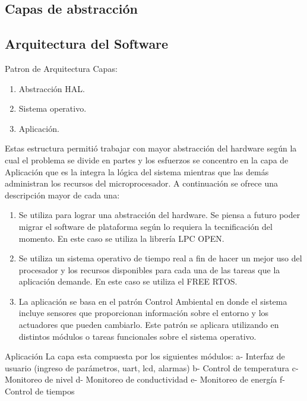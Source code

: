\subsection{Capas de abstracción}
\subsection{Arquitectura del Software}

Patron de Arquitectura
Capas: 
\begin{enumerate}
	\item Abstracción HAL.
	\item Sistema operativo.
	\item Aplicación.
\end{enumerate}

Estas estructura permitió trabajar con mayor abstracción del hardware según la cual el problema se divide en partes y los esfuerzos se concentro en la capa de Aplicación que es la integra la lógica del sistema mientras que las demás administran los recursos del microprocesador. A continuación se ofrece una descripción mayor de cada una:
\begin{enumerate}
	\item Se utiliza para lograr una abstracción del hardware. Se piensa a futuro poder migrar el software de plataforma según lo requiera la tecnificación del momento. En este caso se utiliza la librería LPC OPEN.

	\item Se utiliza un sistema operativo de tiempo real a fin de hacer un mejor uso del procesador y los recursos disponibles para cada una de las tareas que la aplicación demande. En este caso se utiliza el FREE RTOS.

	\item La aplicación se basa en el patrón Control Ambiental en donde el sistema incluye sensores que proporcionan información sobre el entorno y los actuadores que pueden cambiarlo. Este patrón se aplicara utilizando en distintos módulos o tareas funcionales sobre el sistema operativo.
\end{enumerate}

Aplicación
La capa esta compuesta por los siguientes módulos:
a- Interfaz de usuario (ingreso de parámetros, uart, lcd, alarmas) 
b- Control de temperatura
c- Monitoreo de nivel
d- Monitoreo de conductividad
e- Monitoreo de energía
f- Control de tiempos

